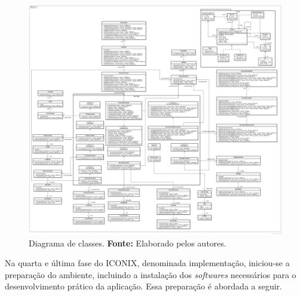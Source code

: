 \newpage
\begin{figure}[h!]
	\centerline{\includegraphics[scale=0.17]{./imagens/classe-full.png}}
	\caption[Diagrama de classes.]
	{Diagrama de classes. \textbf{Fonte:} Elaborado pelos autores.}
	\label{fig:diagrama_classe}
\end{figure}

\newpage
\par Na quarta e última fase do ICONIX, denominada implementação, iniciou-se a preparação do ambiente, incluindo a instalação dos \textit{softwares} necessários para o desenvolvimento prático da aplicação. Essa preparação é abordada a seguir.
